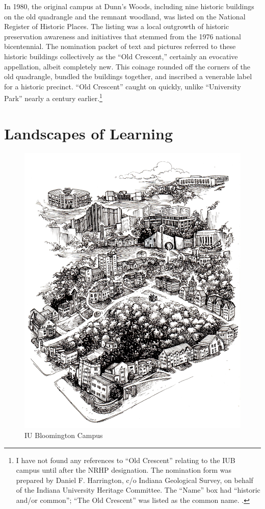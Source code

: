 \documentclass[
  american,
  letterpaper,
]{scrreprt}
\begin{document}
In 1980, the original campus at Dunn's Woods, including nine historic
buildings on the old quadrangle and the remnant woodland, was listed on
the National Register of Historic Places. The listing was a local
outgrowth of historic preservation awareness and initiatives that
stemmed from the 1976 national bicentennial. The nomination packet of
text and pictures referred to these historic buildings collectively as
the ``Old Crescent,'' certainly an evocative appellation, albeit
completely new. This coinage rounded off the corners of the old
quadrangle, bundled the buildings together, and inscribed a venerable
label for a historic precinct. ``Old Crescent'' caught on quickly,
unlike ``University Park'' nearly a century earlier.\footnote{I have not
  found any references to ``Old Crescent'' relating to the IUB campus
  until after the NRHP designation. The nomination form was prepared by
  Daniel F. Harrington, c/o Indiana Geological Survey, on behalf of the
  Indiana University Heritage Committee. The ``Name'' box had ``historic
  and/or common''; ``The Old Crescent'' was listed as the common name.
  .}


\chapter{Landscapes of Learning}\label{sec-seven}

\begin{figure}[H]

{\centering \includegraphics[width=0.6\linewidth,height=\textheight,keepaspectratio]{images/miu7.jpeg}

}

\caption{IU Bloomington Campus}

\end{figure}%
\end{document}
